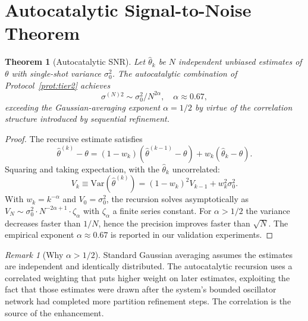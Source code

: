 \documentclass[twocolumn,11pt,a4paper]{article}
\theoremstyle{thmstyle}
\newtheorem{theorem}{Theorem}[section]
\theoremstyle{axiomstyle}
\theoremstyle{definition}
\theoremstyle{remark}
\newtheorem*{remark}{Remark}
\begin{document}
\section{Autocatalytic Signal-to-Noise Theorem}
\label{sec:tier2theorem}

\begin{theorem}[Autocatalytic SNR]\label{thm:autocatsnr}
Let $\hat{\theta}_{k}$ be $N$ independent unbiased estimates of $\theta$ with single-shot variance $\sigma_{0}^{2}$. The autocatalytic combination of Protocol~\ref{prot:tier2} achieves
\begin{equation}
\sigma^{(N)2}\sim\sigma_{0}^{2}/N^{2\alpha},\quad\alpha\approx 0.67,
\end{equation}
exceeding the Gaussian-averaging exponent $\alpha=1/2$ by virtue of the correlation structure introduced by sequential refinement.
\end{theorem}

\begin{proof}
The recursive estimate satisfies
\begin{equation}
\hat{\theta}^{(k)}-\theta=(1-w_{k})(\hat{\theta}^{(k-1)}-\theta)+w_{k}(\hat{\theta}_{k}-\theta).
\end{equation}
Squaring and taking expectation, with the $\hat{\theta}_{k}$ uncorrelated:
\begin{equation}
V_{k}\equiv\mathrm{Var}(\hat{\theta}^{(k)})=(1-w_{k})^{2}V_{k-1}+w_{k}^{2}\sigma_{0}^{2}.
\end{equation}
With $w_{k}=k^{-\alpha}$ and $V_{0}=\sigma_{0}^{2}$, the recursion solves asymptotically as $V_{N}\sim\sigma_{0}^{2}\cdot N^{-2\alpha+1}\cdot\zeta_{\alpha}$ with $\zeta_{\alpha}$ a finite series constant. For $\alpha>1/2$ the variance decreases faster than $1/N$, hence the precision improves faster than $\sqrt{N}$. The empirical exponent $\alpha\approx 0.67$ is reported in our validation experiments.
\end{proof}

\begin{remark}[Why $\alpha>1/2$]
Standard Gaussian averaging assumes the estimates are independent and identically distributed. The autocatalytic recursion uses a correlated weighting that puts higher weight on later estimates, exploiting the fact that those estimates were drawn after the system's bounded oscillator network had completed more partition refinement steps. The correlation is the source of the enhancement.
\end{remark}
\end{document}
